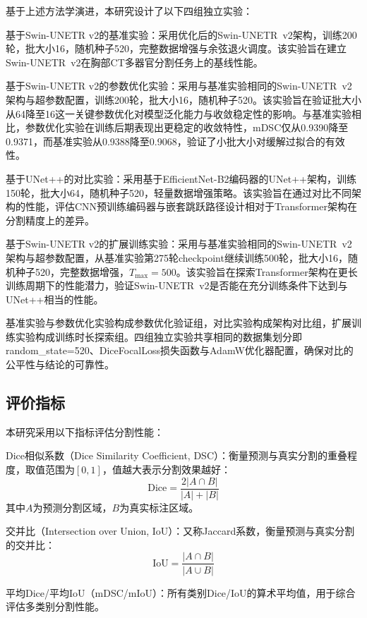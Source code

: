 \documentclass[12pt, a4paper]{article}
\newcommand{\mrm}[1]{\mathrm{#1}}
\newcommand{\Dice}{\mrm{Dice}}
\newcommand{\IoU}{\mrm{IoU}}
\begin{document}
基于上述方法学演进，本研究设计了以下四组独立实验：

基于Swin-UNETR v2的基准实验：采用优化后的Swin-UNETR~v2架构，训练200轮，批大小16，随机种子520，完整数据增强与余弦退火调度。该实验旨在建立Swin-UNETR~v2在胸部CT多器官分割任务上的基线性能。

基于Swin-UNETR v2的参数优化实验：采用与基准实验相同的Swin-UNETR~v2架构与超参数配置，训练200轮，批大小16，随机种子520。该实验旨在验证批大小从64降至16这一关键参数优化对模型泛化能力与收敛稳定性的影响。与基准实验相比，参数优化实验在训练后期表现出更稳定的收敛特性，mDSC仅从0.9390降至0.9371，而基准实验从0.9388降至0.9068，验证了小批大小对缓解过拟合的有效性。

基于UNet++的对比实验：采用基于EfficientNet-B2编码器的UNet++架构，训练150轮，批大小64，随机种子520，轻量数据增强策略。该实验旨在通过对比不同架构的性能，评估CNN预训练编码器与嵌套跳跃路径设计相对于Transformer架构在分割精度上的差异。

基于Swin-UNETR v2的扩展训练实验：采用与基准实验相同的Swin-UNETR~v2架构与超参数配置，从基准实验第275轮checkpoint继续训练500轮，批大小16，随机种子520，完整数据增强，$T_{\max}=500$。该实验旨在探索Transformer架构在更长训练周期下的性能潜力，验证Swin-UNETR~v2是否能在充分训练条件下达到与UNet++相当的性能。

基准实验与参数优化实验构成参数优化验证组，对比实验构成架构对比组，扩展训练实验构成训练时长探索组。四组独立实验共享相同的数据集划分即random\_state=520、DiceFocalLoss损失函数与AdamW优化器配置，确保对比的公平性与结论的可靠性。

\subsection{评价指标}
\label{sec:metrics}

本研究采用以下指标评估分割性能：

Dice相似系数（Dice Similarity Coefficient, DSC）：衡量预测与真实分割的重叠程度，取值范围为$[0, 1]$，值越大表示分割效果越好：
\begin{equation}
    \Dice = \frac{2|A \cap B|}{|A| + |B|}
    \label{eq:dice}
\end{equation}
其中$A$为预测分割区域，$B$为真实标注区域。

交并比（Intersection over Union, IoU）：又称Jaccard系数，衡量预测与真实分割的交并比：
\begin{equation}
    \IoU = \frac{|A \cap B|}{|A \cup B|}
    \label{eq:iou}
\end{equation}

平均Dice/平均IoU（mDSC/mIoU）：所有类别Dice/IoU的算术平均值，用于综合评估多类别分割性能。
\end{document}
